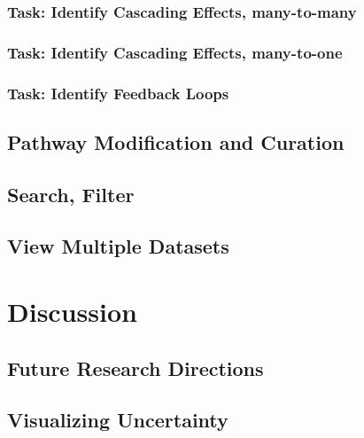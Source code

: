 \documentclass{egpubl}
\begin{document}
\subsubsection{Task: Identify Cascading Effects, many-to-many}
\subsubsection{Task: Identify Cascading Effects, many-to-one}


\subsubsection{Task: Identify Feedback Loops}

\subsection{Pathway Modification and Curation}

\subsection{Search, Filter}

\subsection{View Multiple Datasets}


\section{Discussion}

\subsection{Future Research Directions}

\subsection{Visualizing Uncertainty}
\end{document}
